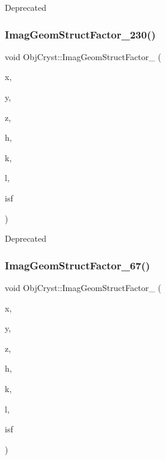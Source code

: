 \begin{DoxyRefDesc}{Deprecated}
\item[\mbox{\hyperlink{deprecated__deprecated000016}{Deprecated}}]\end{DoxyRefDesc}
\mbox{\label{namespace_obj_cryst_a016c95a5ff6be845576d07ce118b59ef}} 
\subsubsection{\texorpdfstring{ImagGeomStructFactor\_230()}{ImagGeomStructFactor\_230()}}
{\footnotesize\ttfamily void Obj\+Cryst\+::\+Imag\+Geom\+Struct\+Factor\+\_ (\begin{DoxyParamCaption}\item[{const R\+E\+AL}]{x,  }\item[{const R\+E\+AL}]{y,  }\item[{const R\+E\+AL}]{z,  }\item[{const Cryst\+Vector\+\_\+\+R\+E\+AL \&}]{h,  }\item[{const Cryst\+Vector\+\_\+\+R\+E\+AL \&}]{k,  }\item[{const Cryst\+Vector\+\_\+\+R\+E\+AL \&}]{l,  }\item[{Cryst\+Vector\+\_\+\+R\+E\+AL \&}]{isf }\end{DoxyParamCaption})}

\begin{DoxyRefDesc}{Deprecated}
\item[\mbox{\hyperlink{deprecated__deprecated000024}{Deprecated}}]\end{DoxyRefDesc}
\mbox{\label{namespace_obj_cryst_a69521b92e103823ab8b1ec2170e635f6}} 
\subsubsection{\texorpdfstring{ImagGeomStructFactor\_67()}{ImagGeomStructFactor\_67()}}
{\footnotesize\ttfamily void Obj\+Cryst\+::\+Imag\+Geom\+Struct\+Factor\+\_ (\begin{DoxyParamCaption}\item[{const R\+E\+AL}]{x,  }\item[{const R\+E\+AL}]{y,  }\item[{const R\+E\+AL}]{z,  }\item[{const Cryst\+Vector\+\_\+\+R\+E\+AL \&}]{h,  }\item[{const Cryst\+Vector\+\_\+\+R\+E\+AL \&}]{k,  }\item[{const Cryst\+Vector\+\_\+\+R\+E\+AL \&}]{l,  }\item[{Cryst\+Vector\+\_\+\+R\+E\+AL \&}]{isf }\end{DoxyParamCaption})}

